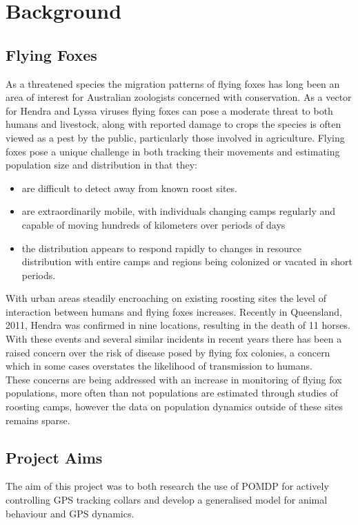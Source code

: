 \documentclass[12pt,openany,a4paper]{book}
\begin{document}
\chapter{Background}
\section{Flying Foxes}
As a threatened species the migration patterns of flying foxes has long been an area of interest for Australian zoologists concerned with conservation. As a vector for Hendra and Lyssa viruses flying foxes can pose a moderate threat to both humans and livestock, along with reported damage to crops the species is often viewed as a pest by the public, particularly those involved in agriculture. Flying foxes pose a unique challenge in both tracking their movements and estimating population size and distribution in that they:
\begin{itemize}
\item are difficult to detect away from known roost sites.
\item are extraordinarily mobile, with individuals changing camps regularly and capable of moving hundreds of kilometers over periods of days
\item the distribution appears to respond rapidly to changes in resource distribution with entire camps and regions being colonized or vacated in short periods\cite{csiroff}.
\end{itemize} 
With urban areas steadily encroaching on existing roosting sites the level of interaction between humans and flying foxes increases. Recently in Queensland, 2011, Hendra was confirmed in nine locations, resulting in the death of 11 horses\cite{abchendra}. With these events and several similar incidents in recent years there has been a raised concern over the risk of disease posed by flying fox colonies, a concern which in some cases overstates the likelihood of transmission to humans.
\\

These concerns are being addressed with an increase in monitoring of flying fox populations, more often than not populations are estimated through studies of roosting camps, however the data on population dynamics outside of these sites remains sparse.

\section{Project Aims}
The aim of this project was to both research the use of POMDP for actively controlling GPS tracking collars and develop a generalised model for animal behaviour and GPS dynamics.  
\end{document}
